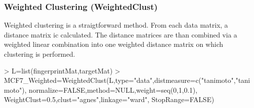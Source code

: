 \documentclass[a4paper]{article}
\begin{document}
\subsubsection{Weighted Clustering (WeightedClust)}
Weighted clustering is a straigtforward method. From each data matrix, a
distance matrix ic calculated. The distance matrices are than combined via a
weighted linear combination into one weighted distance matrix on which
clustering is performed.
\begin{Schunk}
\begin{Sinput}
> L=list(fingerprintMat,targetMat)
> MCF7_Weighted=WeightedClust(L,type="data",distmeasure=c("tanimoto","tanimoto"),
                             normalize=FALSE,method=NULL,weight=seq(0,1,0.1),
                             WeightClust=0.5,clust="agnes",linkage="ward",
                             StopRange=FALSE)
\end{Sinput}
\end{Schunk}
\end{document}
